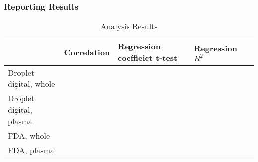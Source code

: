 \documentclass[xcolor=dvipsnames]{beamer}
\begin{document}
\begin{frame}
\frametitle{Reporting Results}


\tiny

\begin{table}[H]
\centering
\caption{Analysis Results}
\label{my-label}
\begin{tabular}{@{}lllll@{}}
\toprule
                        & Correlation & Regression coeffieict t-test & Regression $R^2$ \\ \midrule
Droplet digital, whole  &             &                               &                  \\
Droplet digital, plasma &             &                               &                  \\
FDA, whole              &             &                             &                  \\
FDA, plasma             &             &                              &                  \\ \bottomrule
\end{tabular}
\end{table}

\normalfont

\end{frame}
\end{document}
